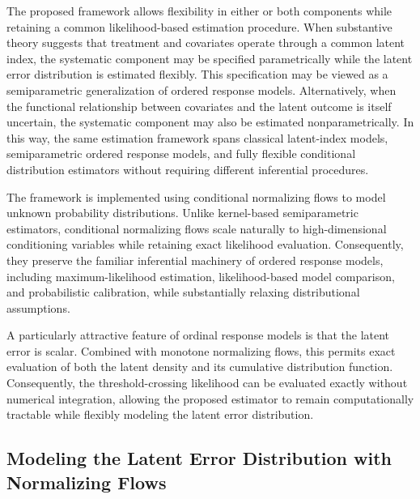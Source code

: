 \documentclass{article}
\begin{document}
The proposed framework allows flexibility in either or both components while retaining a common likelihood-based estimation procedure. When substantive theory suggests that treatment and covariates operate through a common latent index, the systematic component may be specified parametrically while the latent error distribution is estimated flexibly. This specification may be viewed as a semiparametric generalization of ordered response models. Alternatively, when the functional relationship between covariates and the latent outcome is itself uncertain, the systematic component may also be estimated nonparametrically. In this way, the same estimation framework spans classical latent-index models, semiparametric ordered response models, and fully flexible conditional distribution estimators without requiring different inferential procedures.

The framework is implemented using conditional normalizing flows to model unknown probability distributions. Unlike kernel-based semiparametric estimators, conditional normalizing flows scale naturally to high-dimensional conditioning variables while retaining exact likelihood evaluation. Consequently, they preserve the familiar inferential machinery of ordered response models, including maximum-likelihood estimation, likelihood-based model comparison, and probabilistic calibration, while substantially relaxing distributional assumptions.

A particularly attractive feature of ordinal response models is that the latent error is scalar. Combined with monotone normalizing flows, this permits exact evaluation of both the latent density and its cumulative distribution function. Consequently, the threshold-crossing likelihood can be evaluated exactly without numerical integration, allowing the proposed estimator to remain computationally tractable while flexibly modeling the latent error distribution.



\subsection{Modeling the Latent Error Distribution with Normalizing Flows}
\label{subsec:flow}
\end{document}
